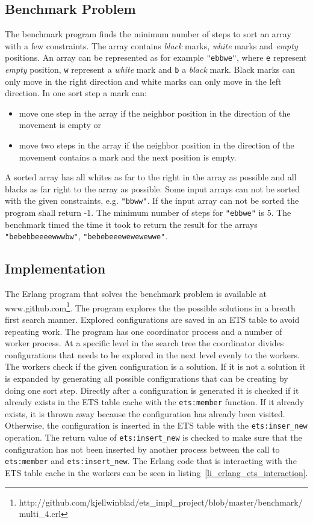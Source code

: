 \documentclass[aps,pre,preprint,nofootinbib]{revtex4}
\begin{document}
  \subsection{Benchmark Problem}
    The benchmark program finds the minimum number of steps to sort an array with a few constraints.
    The array contains \emph{black} marks, \emph{white} marks and \emph{empty} positions.
    An array can be represented as for example \verb|"ebbwe"|, where \verb|e| represent \emph{empty} position, \verb|w| represent a \emph{white} mark and \verb|b| a \emph{black} mark.
    Black marks can only move in the right direction and white marks can only move in the left direction.
    In one sort step a mark can:
    \begin{itemize}
     \item move one step in the array if the neighbor position in the direction of the movement is empty or
     \item move two steps in the array if the neighbor position in the direction of the movement contains a mark and the next position is empty.
    \end{itemize}
    A sorted array has all whites as far to the right in the array as possible and all blacks as far right to the array as possible.
    Some input arrays can not be sorted with the given constraints, e.g. \verb|"bbww"|.
    If the input array can not be sorted the program shall return -1.
    The minimum number of steps for \verb|"ebbwe"| is 5.
    The benchmark timed the time it took to return the result for the arrays \verb|"bebebbeeeewwwbw"|, \verb|"bebebeeewewewewwe"|.
    
  \subsection{Implementation}
    The Erlang program that solves the benchmark problem is available at www.github.com\footnote{http://github.com/kjellwinblad/ets\_impl\_project/blob/master/benchmark/multi\_4.erl}.
    The program explores the the possible solutions in a breath first search manner.
    Explored configurations are saved in an ETS table to avoid repeating work.
    The program has one coordinator process and a number of worker process.
    At a specific level in the search tree the coordinator divides configurations that needs to be explored in the next level evenly to the workers.
    The workers check if the given configuration is a solution.
    If it is not a solution it is expanded by generating all possible configurations that can be creating by doing one sort step.
    Directly after a configuration is generated it is checked if it already exists in the ETS table cache with the \verb|ets:member| function.
    If it already exists, it is thrown away because the configuration has already been visited.
    Otherwise, the configuration is inserted in the ETS table with the \verb|ets:inser_new| operation.
    The return value of \verb|ets:insert_new| is checked to make sure that the configuration has not been inserted by another process between the call to \verb|ets:member| and \verb|ets:insert_new|.
    The Erlang code that is interacting with the ETS table cache in the workers can be seen in listing~\ref{li_erlang_ets_interaction}.
\end{document}
